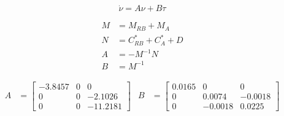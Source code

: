 \documentclass[12pt,a4]{article}
\begin{document}
\begin{equation}
	\dot{\nu} = A \nu + B \tau
\end{equation}

\begin{align}
	M & = M_{RB} + M_A           \\
	N & = C^*_{RB} + C^*_{A} + D \\
	A & = -M^{-1}N               \\
	B & = M^{-1}
\end{align}

\begin{align}
	A & = \left[\begin{array}{ccc} -3.8457 & 0 & 0\\ 0 & 0 & -2.1026\\ 0 & 0 & -11.2181 \end{array}\right]
	  &
	B & = \left[\begin{array}{ccc} 0.0165 & 0 & 0\\ 0 & 0.0074 & -0.0018\\ 0 & -0.0018 & 0.0225 \end{array}\right]
\end{align}
\end{document}

